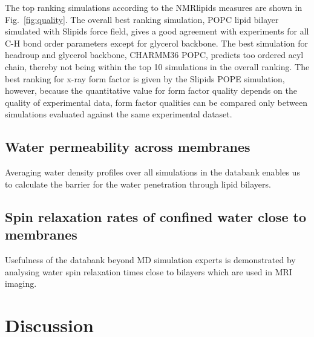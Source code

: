 \documentclass[fleqn,10pt]{wlscirep}
\begin{document}
The top ranking simulations according to the NMRlipids measures are shown in Fig.~\ref{fig:quality}. The overall best ranking simulation, POPC lipid bilayer simulated with Slipids force field, gives a good agreement with experiments for all C-H bond order parameters except for glycerol backbone. The best simulation for headroup and glycerol backbone, CHARMM36 POPC, predicts too ordered acyl chain, thereby not being within the top 10 simulations in the overall ranking. The best ranking for x-ray form factor is given by the Slipids POPE simulation, however, because the quantitative value for form factor quality depends on the quality of experimental data, form factor qualities can be compared only between simulations evaluated against the same experimental dataset.

\subsection{Water permeability across membranes}

Averaging water density profiles over all simulations in the databank enables us to calculate the barrier for the water penetration through lipid bilayers.

\subsection{Spin relaxation rates of confined water close to membranes}

Usefulness of the databank beyond MD simulation experts is demonstrated by analysing water spin relaxation times close to bilayers which are used in MRI imaging.



 

\section{Discussion}
\end{document}
